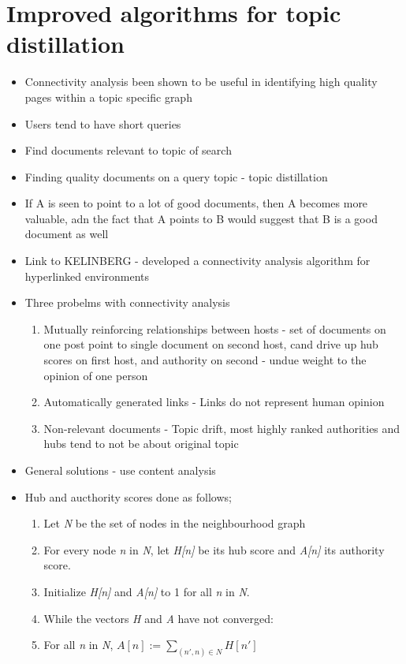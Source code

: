 \documentclass[11pt]{report}
\begin{document}
\section{Improved algorithms for topic distillation}
\begin{itemize}
\item Connectivity analysis been shown to be useful in identifying high quality pages within a topic specific graph
\item Users tend to have short queries
\item Find documents relevant to topic of search
\item Finding quality documents on a query topic - topic distillation
\item If A is seen to point to a lot of good documents, then A becomes more valuable, adn the fact that A points to B would suggest that B is a good document as well
\item Link to KELINBERG - developed a connectivity analysis algorithm for hyperlinked environments
\item Three probelms with connectivity analysis
\begin{enumerate}
\item Mutually reinforcing relationships between hosts - set of documents on one post point to single document on second host, cand drive up hub scores on first host, and authority on second - undue weight to the opinion of one person
\item Automatically generated links - Links do not represent human opinion
\item Non-relevant documents - Topic drift, most highly ranked authorities and hubs tend to not be about original topic
\end{enumerate} 
\item General solutions - use content analysis
\item Hub and aucthority scores done as follows;
\begin{enumerate}
\item Let \textit{N} be the set of nodes in the neighbourhood graph
\item For every node \textit{n} in \textit{N}, let \textit{H[n]} be its hub score and \textit{A[n]} its authority score.
\item Initialize \textit{H[n]} and \textit{A[n]} to 1 for all \textit{n} in \textit{N}.
\item While the vectors \textit{H} and \textit{A} have not converged:
\item For all \textit{n} in \textit{N}, $A[n]:=\sum_{(n',n)\in N} H[n']$

\end{enumerate}
\end{itemize}
\end{document}
